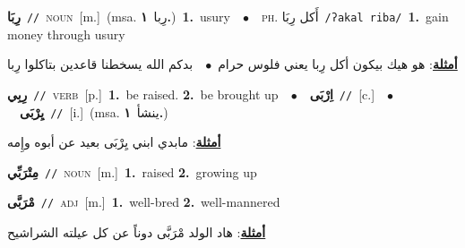 \documentclass[10pt,a4paper,twoside]{article} %
\begin{document}
\begin{multicols}{2}
{\setlength\topsep{0pt}\textbf{\foreignlanguage{arabic}{رِبَا}}\ {\color{gray}\texttt{//}\color{black}}\ \textsc{noun}\ [m.]\ \color{gray}(msa. \foreignlanguage{arabic}{رِبا}~\foreignlanguage{arabic}{\textbf{١.}})\color{black}\ \textbf{1.}~usury\ \ $\bullet$\ \ \textsc{ph.} \color{gray} \foreignlanguage{arabic}{أَكل رِبَا}\color{black}\ {\color{gray}\texttt{/{\sffamily ʔakal riba}/}\color{black}}\ \textbf{1.}~gain money through usury\  \begin{flushright}\color{gray}\foreignlanguage{arabic}{\textbf{\underline{\foreignlanguage{arabic}{أمثلة}}}: هو هيك بيكون أكل رِبا يعني فلوس حرام\ $\bullet$\ \  بدكم الله يسخطنا قاعدين بتاكلوا رِبا}\end{flushright}\color{black}} \vspace{2mm}

{\setlength\topsep{0pt}\textbf{\foreignlanguage{arabic}{رِبِي}}\ {\color{gray}\texttt{//}\color{black}}\ \textsc{verb}\ [p.]\ \textbf{1.}~be raised.  \textbf{2.}~be brought up\ \ $\bullet$\ \ \setlength\topsep{0pt}\textbf{\foreignlanguage{arabic}{اِرْبَى}}\ {\color{gray}\texttt{//}\color{black}}\ [c.]\ \ $\bullet$\ \ \setlength\topsep{0pt}\textbf{\foreignlanguage{arabic}{يِرْبَى}}\ {\color{gray}\texttt{//}\color{black}}\ [i.]\ \color{gray}(msa. \foreignlanguage{arabic}{ينشأ}~\foreignlanguage{arabic}{\textbf{١.}})\color{black}\  \begin{flushright}\color{gray}\foreignlanguage{arabic}{\textbf{\underline{\foreignlanguage{arabic}{أمثلة}}}: مابدي ابني يِرْبَى بعيد عن أبوه وإِمه}\end{flushright}\color{black}} \vspace{2mm}

{\setlength\topsep{0pt}\textbf{\foreignlanguage{arabic}{مِتْرَبِّي}}\ {\color{gray}\texttt{//}\color{black}}\ \textsc{noun}\ [m.]\ \textbf{1.}~raised  \textbf{2.}~growing up\ } \vspace{2mm}

{\setlength\topsep{0pt}\textbf{\foreignlanguage{arabic}{مْرَبَّى}}\ {\color{gray}\texttt{//}\color{black}}\ \textsc{adj}\ [m.]\ \textbf{1.}~well-bred  \textbf{2.}~well-mannered\  \begin{flushright}\color{gray}\foreignlanguage{arabic}{\textbf{\underline{\foreignlanguage{arabic}{أمثلة}}}: هاد الولد مْرَبَّى دوناً عن كل عيلته الشراشيح}\end{flushright}\color{black}} \vspace{2mm}


\end{multicols}
\end{document}
